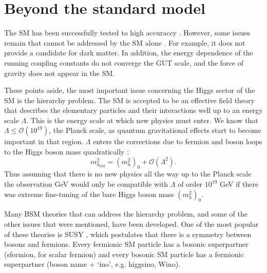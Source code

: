 \section{Beyond the standard model}
\label{sec:theory_BSM}
The \ac{SM} has been successfully tested to high accuraccy \cite{pdg-2014}. However,
some issues remain that cannot be addressed by the \ac{SM} alone \cite{griffiths}.
For example, it does not provide a candidate for dark matter.
In addition, the energy dependence of the running coupling constants
do not converge the GUT scale, and the force of gravity does not
appear in the \ac{SM}.

These points aside, the most important issue concerning
the Higgs sector of the \ac{SM} is the hierarchy problem.
The \ac{SM}
is accepted to be an effective field theory that describes
the elementary particles and their interactions well up to an energy scale $\Lambda$.
This is the energy scale at which new physics must enter.
We know that $\Lambda \leq \mathcal{O}(10^{19})$, the Planck scale, as quantum 
gravitational effects start to become important in that region. $\Lambda$ enters
the corrections due to fermion and boson loops to the Higgs boson mass quadratically \cite{MSSM-carena-haber}:
\begin{equation}\label{eqn:mh_hierarchy}
m_{h_{\text{SM}}}^2  = (m_h^2)_0 + \mathcal{O}(\Lambda^2).
\end{equation}
Thus assuming that there is no new physics all the way up to
the Planck scale the observation  GeV would only be compatible with $\Lambda$ of order $10^{19}$ GeV
if there was extreme fine-tuning of the bare Higgs boson mass $(m_h^2)_0$.

Many \acf{BSM} theories that can address the hierarchy problem, and some of
the other issues that were mentioned, have been developed.
One of the most
popular of these theories is \acf{SUSY} \cite{SUSY-primer}, which postulates
that there is a symmetry between bosons and fermions. Every fermionic
\ac{SM} particle has a bosonic superpartner (sfermion, for scalar fermion)
and every bosonic \ac{SM} particle
has a fermionic superpartner (boson name + `ino', e.g. higgsino, Wino).

